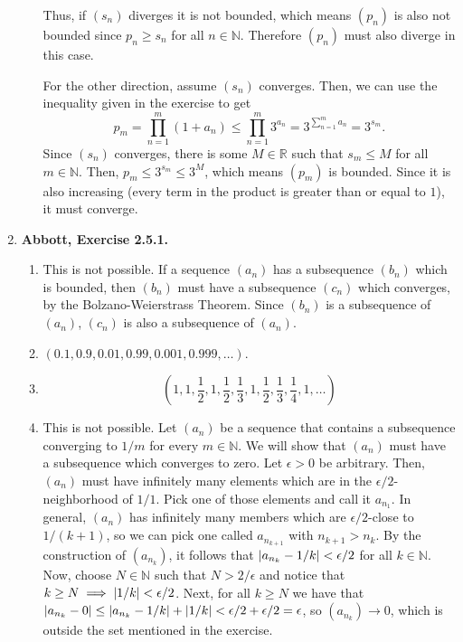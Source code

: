 \documentclass{article}
\DeclarePairedDelimiter\abs{\lvert}{\rvert}
\newcommand{\N}{\mathbb{N}}
\newcommand{\R}{\mathbb{R}}
\newcommand{\exc}[2][Abbott]{\item \textbf{#1, Exercise #2.}}
\newcommand{\lep}[1][L]{#1et $\epsilon > 0$ be arbitrary}
\begin{document}
\begin{enumerate}
\begin{enumerate}
        Thus, if $(s_n)$ diverges it is not bounded, which means $(p_n)$ is also not bounded since $p_n \geq s_n$ for all $n \in \N$. Therefore $(p_n)$ must also diverge in this case.
        
        For the other direction, assume $(s_n)$ converges. Then, we can use the inequality given in the exercise to get 
        \begin{equation*}
            p_m = \prod_{n=1}^m (1+a_n) \leq \prod_{n=1}^m 3^{a_n} 
            = 3^{\sum\limits_{n=1}^m a_n} = 3^{s_m}.
        \end{equation*} Since $(s_n)$ converges, there is some $M \in \R$ such that $s_m \leq M$ for all $m \in \N$. Then, $p_m \leq 3^{s_m}\leq 3^M$, which means $(p_m)$ is bounded. Since it is also increasing (every term in the product is greater than or equal to $1$), it must converge.
    \end{enumerate}
    
    \exc{2.5.1}
    \begin{enumerate}
        \item This is not possible. If a sequence $(a_n)$ has a subsequence $(b_n)$ which is bounded, then $(b_n)$ must have a subsequence $(c_n)$ which converges, by the Bolzano-Weierstrass Theorem. Since $(b_n)$ is a subsequence of $(a_n)$, $(c_n)$ is also a subsequence of $(a_n)$.
        
        \item $(0.1,0.9,0.01,0.99,0.001,0.999, \dots)$.
        
        \item \begin{equation*}
            (1, 1, \frac{1}{2}, 1, \frac{1}{2}, \frac{1}{3}, 1, \frac{1}{2}, \frac{1}{3}, \frac{1}{4}, 1, \dots)
        \end{equation*}
        
        \item This is not possible. Let $(a_n)$ be a sequence that contains a subsequence converging to $1/m$ for every $m \in \N$. We will show that $(a_n)$ must have a subsequence which converges to zero. \lep. Then, $(a_n)$ must have infinitely many elements which are in the $\epsilon/2$-neighborhood of $1/1$. Pick one of those elements and call it $a_{n_1}$. In general, $(a_n)$ has infinitely many members which are $\epsilon/2$-close to $1/(k+1)$, so we can pick one called $a_{n_{k+1}}$ with $n_{k+1} > n_k$. By the construction of $(a_{n_k})$, it follows that $\abs*{a_{n_k} - 1/k} < \epsilon/2$ for all $k \in \N$. Now, choose $N \in \N$ such that $N > 2/\epsilon$ and notice that $k \geq N \implies \abs*{1/k} < \epsilon/2$. Next, for all $k \geq N$ we have that $\abs*{a_{n_k}-0} \leq \abs*{a_{n_k}-1/k}+\abs*{1/k} < \epsilon/2 + \epsilon/2 = \epsilon$, so $(a_{n_k}) \to 0$, which is outside the set mentioned in the exercise.
    \end{enumerate}
    

\end{enumerate}
\end{document}

